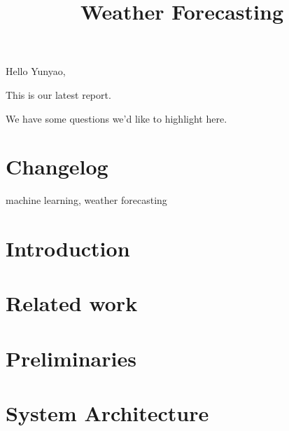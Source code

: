 



Hello Yunyao,

This is our latest report.

We have some questions we'd like to highlight here.

\section{Changelog}




\newpage

\title{Weather Forecasting}
\author{
    \and
    \and
    \and
}


\maketitle

\begin{abstract}

\end{abstract}

\begin{IEEEkeywords}
machine learning, weather forecasting
\end{IEEEkeywords}

\section{Introduction}


\section{Related work}\label{sec:relatedwork}




\section{Preliminaries}


\section{System Architecture} %









